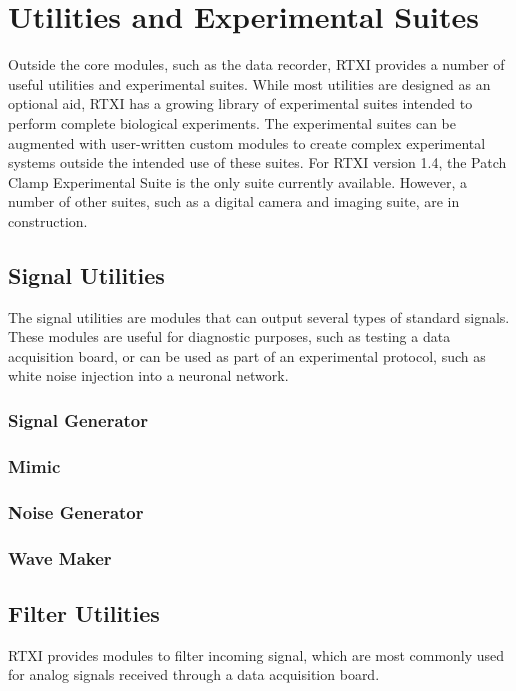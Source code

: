 \clearpage
\chapter{Utilities and Experimental Suites}
Outside the core modules, such as the data recorder, RTXI provides a number of useful utilities and experimental suites. While most utilities are designed as an optional aid, RTXI has a growing library of experimental suites intended to perform complete biological experiments. The experimental suites can be augmented with user-written custom modules to create complex experimental systems outside the intended use of these suites. For RTXI version 1.4, the Patch Clamp Experimental Suite is the only suite currently available. However, a number of other suites, such as a digital camera and imaging suite, are in construction.

\clearpage
\section{Signal Utilities}
The signal utilities are modules that can output several types of standard signals. These modules are useful for diagnostic purposes, such as testing a data acquisition board, or can be used as part of an experimental protocol, such as white noise injection into a neuronal network.

\subsection{Signal Generator}


\subsection{Mimic}


\subsection{Noise Generator}


\subsection{Wave Maker}


\clearpage
\section{Filter Utilities}
RTXI provides modules to filter incoming signal, which are most commonly used for analog signals received through a data acquisition board. 


